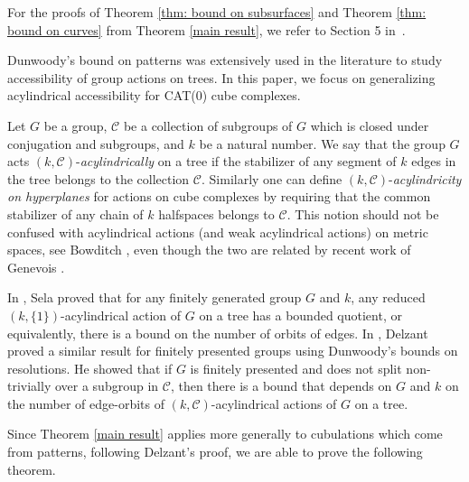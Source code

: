 
For the proofs of Theorem \ref{thm: bound on subsurfaces} and Theorem \ref{thm: bound on curves}  from Theorem \ref{main result}, we refer to Section 5 in~\cite{BeLa16}.

Dunwoody's bound on patterns was extensively used in the literature to study accessibility of group actions on trees.
In this paper, we focus on generalizing acylindrical accessibility for CAT(0) cube complexes.

Let $G$ be a group, $\mathcal{C}$ be a collection of subgroups of $G$ which is closed under conjugation and subgroups, and $k$ be a natural number. 
We say that the group $G$ acts $(k,\mathcal{C})$-\emph{acylindrically} on a tree if the stabilizer of any segment of $k$ edges in the tree belongs to the collection $\mathcal{C}$. 
Similarly one can define $(k,\mathcal{C})$-\emph{acylindricity on hyperplanes} for actions on cube complexes by requiring that the common stabilizer of any chain of $k$ halfspaces belongs to $\mathcal{C}$.
This notion should not be confused with acylindrical actions (and weak acylindrical actions) on metric spaces, see Bowditch \cite{Bow08}, even though the two are related by recent work of Genevois \cite{Gen16}.


In \cite{Sel97}, Sela proved that for any finitely generated group $G$ and $k$, any reduced $(k,\{1\})$-acylindrical action of $G$ on a tree has a bounded quotient, or equivalently, there is a bound on the number of orbits of edges.
In \cite{Del99}, Delzant proved a similar result for finitely presented groups using Dunwoody's bounds on resolutions. He showed that if $G$ is finitely presented and does not split non-trivially over a subgroup in $\mathcal{C}$, then there is a bound that depends on $G$ and $k$ on the number of edge-orbits of $(k,\mathcal{C})$-acylindrical actions of $G$ on a tree.

Since Theorem \ref{main result} applies more generally to cubulations which come from patterns, following Delzant's proof, we are able to prove the following theorem.


